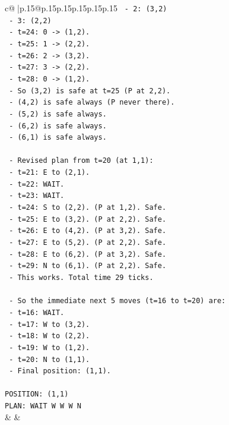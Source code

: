 \documentclass{article}
\begin{document}
{\begin{supertabular}{c@{$\;$}|p{.15\linewidth}@{}p{.15\linewidth}p{.15\linewidth}p{.15\linewidth}p{.15\linewidth}p{.15\linewidth}}
{{{\texttt{        {-} 2: (3,2)} \\
\texttt{        {-} 3: (2,2)} \\
\texttt{      {-} t=24: 0 {-}> (1,2).} \\
\texttt{      {-} t=25: 1 {-}> (2,2).} \\
\texttt{      {-} t=26: 2 {-}> (3,2).} \\
\texttt{      {-} t=27: 3 {-}> (2,2).} \\
\texttt{      {-} t=28: 0 {-}> (1,2).} \\
\texttt{      {-} So (3,2) is safe at t=25 (P at 2,2).} \\
\texttt{      {-} (4,2) is safe always (P never there).} \\
\texttt{      {-} (5,2) is safe always.} \\
\texttt{      {-} (6,2) is safe always.} \\
\texttt{      {-} (6,1) is safe always.} \\
\\ 
\texttt{      {-} Revised plan from t=20 (at 1,1):} \\
\texttt{        {-} t=21: E to (2,1).} \\
\texttt{        {-} t=22: WAIT.} \\
\texttt{        {-} t=23: WAIT.} \\
\texttt{        {-} t=24: S to (2,2). (P at 1,2). Safe.} \\
\texttt{        {-} t=25: E to (3,2). (P at 2,2). Safe.} \\
\texttt{        {-} t=26: E to (4,2). (P at 3,2). Safe.} \\
\texttt{        {-} t=27: E to (5,2). (P at 2,2). Safe.} \\
\texttt{        {-} t=28: E to (6,2). (P at 3,2). Safe.} \\
\texttt{        {-} t=29: N to (6,1). (P at 2,2). Safe.} \\
\texttt{      {-} This works. Total time 29 ticks.} \\
\\ 
\texttt{  {-} So the immediate next 5 moves (t=16 to t=20) are:} \\
\texttt{    {-} t=16: WAIT.} \\
\texttt{    {-} t=17: W to (3,2).} \\
\texttt{    {-} t=18: W to (2,2).} \\
\texttt{    {-} t=19: W to (1,2).} \\
\texttt{    {-} t=20: N to (1,1).} \\
\texttt{  {-} Final position: (1,1).} \\
\\ 
\texttt{POSITION: (1,1)} \\
\texttt{PLAN: WAIT W W W N} \\
            }
        }
    }
    & & \\ \\


\end{supertabular}}
\end{document}
